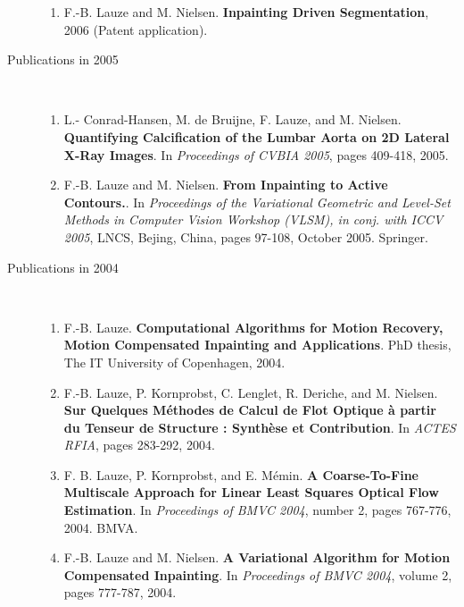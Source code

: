 \documentclass[10pt]{article}
\begin{document}
\begin{description}
\begin{enumerate}
  \item F.-B. Lauze and M. Nielsen.  \textbf{Inpainting Driven Segmentation}, 2006 (Patent
    application).
 
  \end{enumerate}

\item[Publications in 2005]~\\
  \begin{enumerate}

  \item L.- Conrad-Hansen, M. de Bruijne, F. Lauze, and M. Nielsen.  \textbf{Quantifying
      Calcification of the Lumbar Aorta on 2D Lateral X-Ray Images}.  In
    \textit{Proceedings of CVBIA 2005}, pages 409-418, 2005.

  \item F.-B. Lauze and M. Nielsen.  \textbf{From Inpainting to Active Contours.}.  In
    \textit{Proceedings of the Variational Geometric and Level-Set Methods in Computer
      Vision Workshop (VLSM), in conj. with ICCV 2005}, LNCS, Bejing, China, pages 97-108,
    October 2005.  Springer.
  
  \end{enumerate}

\item[Publications in 2004]~\\
  \begin{enumerate}
  
  \item F.-B. Lauze.  \textbf{Computational Algorithms for Motion Recovery, Motion
      Compensated Inpainting and Applications}.  PhD thesis, The IT University of
    Copenhagen, 2004.

  \item F.-B. Lauze, P. Kornprobst, C. Lenglet, R. Deriche, and M. Nielsen.  \textbf{Sur
      Quelques M{\'e}thodes de Calcul de Flot Optique {\`a} partir du Tenseur de Structure
      : Synth{\`e}se et Contribution}.  In \textit{ACTES RFIA}, pages 283-292, 2004.

  \item F. B. Lauze, P. Kornprobst, and E. M{\'e}min.  \textbf{A Coarse-To-Fine Multiscale
      Approach for Linear Least Squares Optical Flow Estimation}.  In \textit{Proceedings
      of BMVC 2004}, number 2, pages 767-776, 2004.  BMVA.

  \item F.-B. Lauze and M. Nielsen.  \textbf{A Variational Algorithm for Motion
      Compensated Inpainting}.  In \textit{Proceedings of BMVC 2004}, volume 2, pages
    777-787, 2004.


\end{enumerate}
\end{description}
\end{document}
